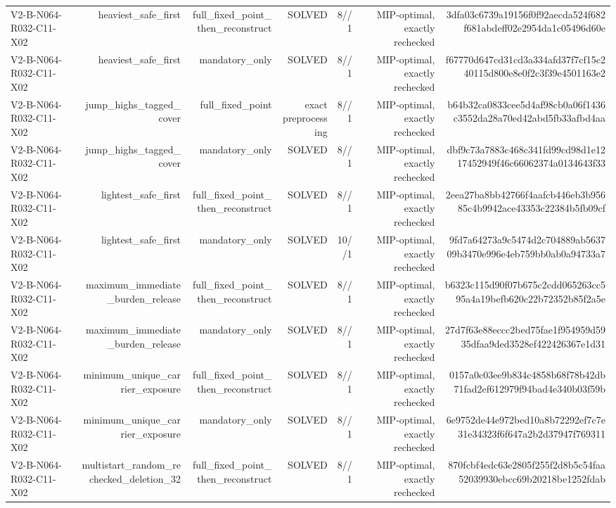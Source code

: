 {\begin{longtable}{lrrrrrr}
V2-B-N064-R032-C11-X02 & heaviest\_safe\_first & full\_fixed\_point\_then\_reconstruct & SOLVED & 8//1 & MIP-optimal, exactly rechecked & 3dfa03c6739a19156f0f92aecda524f682f681abdeff02e2954da1c05496d60e \\
V2-B-N064-R032-C11-X02 & heaviest\_safe\_first & mandatory\_only & SOLVED & 8//1 & MIP-optimal, exactly rechecked & f67770d647cd31cd3a334afd37f7cf15c240115d800e8e0f2c3f39e4501163e2 \\
V2-B-N064-R032-C11-X02 & jump\_highs\_tagged\_cover & full\_fixed\_point & exact preprocessing & 8//1 & MIP-optimal, exactly rechecked & b64b32ca0833cee5d4af98cb0a06f1436c3552da28a70ed42abd5fb33afbd4aa \\
V2-B-N064-R032-C11-X02 & jump\_highs\_tagged\_cover & mandatory\_only & SOLVED & 8//1 & MIP-optimal, exactly rechecked & dbf9c73a7883c468c341fd99cd98d1e1217452949f46c66062374a0134643f33 \\
V2-B-N064-R032-C11-X02 & lightest\_safe\_first & full\_fixed\_point\_then\_reconstruct & SOLVED & 8//1 & MIP-optimal, exactly rechecked & 2eea27ba8bb42766f4aafcb446eb3b95685c4b9942ace43353c22384b5fb09cf \\
V2-B-N064-R032-C11-X02 & lightest\_safe\_first & mandatory\_only & SOLVED & 10//1 & MIP-optimal, exactly rechecked & 9fd7a64273a9c5474d2c704889ab563709b3470e996e4eb759bb0ab0a94733a7 \\
V2-B-N064-R032-C11-X02 & maximum\_immediate\_burden\_release & full\_fixed\_point\_then\_reconstruct & SOLVED & 8//1 & MIP-optimal, exactly rechecked & b6323c115d90f07b675c2cdd065263cc595a4a19befb620c22b72352b85f2a5e \\
V2-B-N064-R032-C11-X02 & maximum\_immediate\_burden\_release & mandatory\_only & SOLVED & 8//1 & MIP-optimal, exactly rechecked & 27d7f63e88eccc2bed75fae1f954959d5935dfaa9ded3528ef422426367e1d31 \\
V2-B-N064-R032-C11-X02 & minimum\_unique\_carrier\_exposure & full\_fixed\_point\_then\_reconstruct & SOLVED & 8//1 & MIP-optimal, exactly rechecked & 0157a0c03ee9b834c4858b68f78b42db71fad2ef612979f94bad4e340b03f59b \\
V2-B-N064-R032-C11-X02 & minimum\_unique\_carrier\_exposure & mandatory\_only & SOLVED & 8//1 & MIP-optimal, exactly rechecked & 6e9752de44e972bed10a8b72292ef7c7e31e34323f6f647a2b2d37947f769311 \\
V2-B-N064-R032-C11-X02 & multistart\_random\_rechecked\_deletion\_32 & full\_fixed\_point\_then\_reconstruct & SOLVED & 8//1 & MIP-optimal, exactly rechecked & 870fcbf4edc63e2805f255f2d8b5c54faa52039930ebcc69b20218be1252fdab \\

\end{longtable}}
